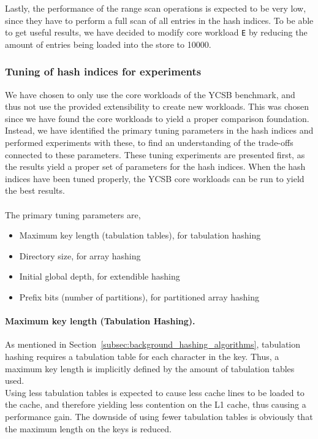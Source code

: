 \documentclass[11pt]{article} %
\begin{document}
Lastly, the performance of the range scan operations is expected to be very low, since they have to perform a full scan of all entries in the hash indices. To be able to get useful results, we have decided to modify core workload \verb|E| by reducing the amount of entries being loaded into the store to 10000.
\subsubsection{Tuning of hash indices for experiments}
\label{subsubsec:tuning_experiments}
We have chosen to only use the core workloads of the YCSB benchmark, and thus not use the provided extensibility to create new workloads. This was chosen since we have found the core workloads to yield a proper comparison foundation. Instead, we have identified the primary tuning parameters in the hash indices and performed experiments with these, to find an understanding of the trade-offs connected to these parameters. These tuning experiments are presented first, as the results yield a proper set of parameters for the hash indices. When the hash indices have been tuned properly, the YCSB core workloads can be run to yield the best results.\\
\\
The primary tuning parameters are,
\begin{itemize}
  \item Maximum key length (tabulation tables), for tabulation hashing
  \item Directory size, for array hashing
  \item Initial global depth, for extendible hashing
  \item Prefix bits (number of partitions), for partitioned array hashing
\end{itemize}
\paragraph{Maximum key length (Tabulation Hashing).} As mentioned in Section~\ref{subsec:background_hashing_algorithms}, tabulation hashing requires a tabulation table for each character in the key. Thus, a maximum key length is implicitly defined by the amount of tabulation tables used. \\

Using less tabulation tables is expected to cause less cache lines to be loaded to the cache, and therefore yielding less contention on the L1 cache, thus causing a performance gain. The downside of using fewer tabulation tables is obviously that the maximum length on the keys is reduced.\\
\end{document}
